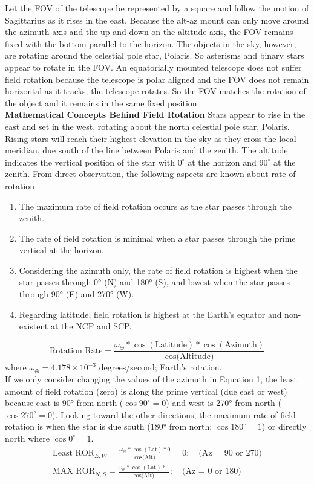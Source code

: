 \documentclass[a4paper,12pt]{extarticle}
\begin{document}
Let the FOV of the telescope be represented by a
square and follow the motion of Sagittarius as it
rises in the east. Because the alt-az mount can only
move around the azimuth axis and the up and down
on the altitude axis, the FOV remains fixed with the
bottom parallel to the horizon. The objects in the sky, however, are rotating around the celestial pole star, Polaris. So asterisms and binary stars appear to rotate in the FOV. An equatorially mounted telescope does not suffer field rotation because the telescope is polar aligned and the FOV does not remain horizontal as it tracks; the telescope rotates. So the FOV matches the rotation of the object and it remains in the same fixed position.\\

\textbf{Mathematical Concepts Behind Field Rotation}
Stars appear to rise in the east and set in the west, rotating about the north celestial pole star, Polaris. Rising stars will reach their highest elevation in the sky as they cross the local meridian, due south of the line between Polaris and the zenith. The altitude indicates the vertical position of the star with $0^\circ$ at the horizon and $90^\circ$ at the zenith. From direct observation, the following aspects are known about rate of rotation
\begin{enumerate}
	\item The maximum rate of field rotation occurs as the star passes through the zenith.
	\item The rate of field rotation is minimal when a star passes through the prime vertical at the
	horizon.
	\item Considering the azimuth only, the rate of field rotation is highest when the star passes
	through 0° (N) and 180° (S), and lowest when
	the star passes through 90° (E) and 270° (W).
	\item Regarding latitude, field rotation is highest at the Earth’s equator and non-existent at the NCP and SCP.
\end{enumerate}

\begin{equation}
	\text{Rotation Rate}= \frac{\omega_\oplus \ast \cos(\text{Latitude}) \ast \cos(\text{Azimuth})}{\cos\text{(Altitude)}}
\end{equation}
where $\omega_\oplus=4.178 \times 10^{-3}$ degrees/second; Earth’s rotation. \\

If we only consider changing the values of the
azimuth in Equation 1, the least amount of field rotation (zero) is along the prime vertical (due east or west) because east is 90° from north ($\cos90^\circ=0$) and west is 270° from north ($\cos270^\circ=0$). Looking toward the other directions, the maximum rate of field rotation is when the star is due south (180° from north; $\cos180^\circ=1$) or directly north where $\cos0^\circ=1$.
\begin{gather*}
	\text{Least ROR}_{E,W}= \frac{\omega_\oplus \ast \cos(\text{Lat}) \ast 0}{\cos\text{(Alt)}}=0;\quad \text{(Az = 90 or 270)}\\
	\text{MAX ROR}_{N,S}= \frac{\omega_\oplus \ast \cos(\text{Lat}) \ast 1}{\cos\text{(Alt)}};\quad \text{(Az = 0 or 180)}
\end{gather*}
\end{document}
